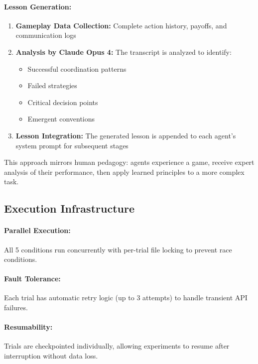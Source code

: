 \paragraph{Lesson Generation:}
\begin{enumerate}
    \item \textbf{Gameplay Data Collection:} Complete action history, payoffs, and communication logs
    \item \textbf{Analysis by Claude Opus 4:} The transcript is analyzed to identify:
    \begin{itemize}
        \item Successful coordination patterns
        \item Failed strategies
        \item Critical decision points
        \item Emergent conventions
    \end{itemize}
    \item \textbf{Lesson Integration:} The generated lesson is appended to each agent's system prompt for subsequent stages
\end{enumerate}

This approach mirrors human pedagogy: agents experience a game, receive expert analysis of their performance, then apply learned principles to a more complex task.

\subsection{Execution Infrastructure}

\paragraph{Parallel Execution:}
All 5 conditions run concurrently with per-trial file locking to prevent race conditions.

\paragraph{Fault Tolerance:}
Each trial has automatic retry logic (up to 3 attempts) to handle transient API failures.

\paragraph{Resumability:}
Trials are checkpointed individually, allowing experiments to resume after interruption without data loss.

